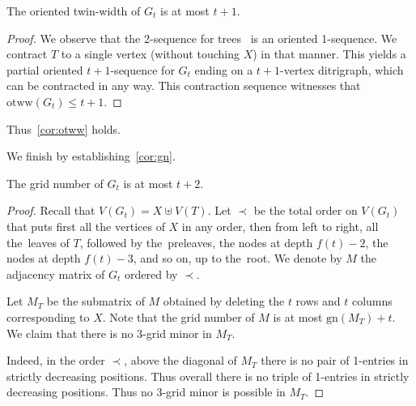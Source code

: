 \documentclass[a4paper,UKenglish,cleveref,hyperref,autoref]{lipics-v2021}
\renewcommand{\leq}{\leqslant}
\newcommand{\prels}{preleaves\xspace}
\newcommand{\otww}{\text{otww}}
\newcommand{\gn}{\text{gn}}
\begin{document}
\begin{lemma}\label{lem:otww}
 The oriented twin-width of $G_t$ is at most $t+1$.
\end{lemma}
\begin{proof}
  We observe that the 2-sequence for trees~\cite{twin-width1} is an oriented 1-sequence.
  We contract $T$ to a single vertex (without touching $X$) in that manner.
  This yields a partial oriented $t+1$-sequence for $G_t$ ending on a $t+1$-vertex ditrigraph, which can be contracted in any way.
  This contraction sequence witnesses that $\otww(G_t) \leq t+1$.
\end{proof}
Thus~\cref{cor:otww} holds.

\medskip

We finish by establishing~\cref{cor:gn}.
\begin{lemma}\label{lem:gn}
 The grid number of $G_t$ is at most $t+2$.
\end{lemma}

\begin{proof}
 Recall that $V(G_t) = X \uplus V(T)$.
 Let $\prec$ be the total order on $V(G_t)$ that puts first all the vertices of $X$ in any order, then from left to right, all the~leaves of $T$, followed by the~\prels, the nodes at depth $f(t)-2$, the nodes at depth $f(t)-3$, and so on, up to the~root.
 We denote by $M$ the adjacency matrix of $G_t$ ordered by $\prec$.

 Let $M_T$ be the submatrix of $M$ obtained by deleting the $t$ rows and $t$ columns corresponding to $X$.
 Note that the grid number of $M$ is at most $\gn(M_T)+t$.
 We claim that there is no 3-grid minor in $M_T$.
 
 Indeed, in the order $\prec$, above the diagonal of $M_T$ there is no pair of 1-entries in strictly decreasing positions.
 Thus overall there is no triple of 1-entries in strictly decreasing positions.
 Thus no 3-grid minor is possible in $M_T$.
\end{proof}
\end{document}
